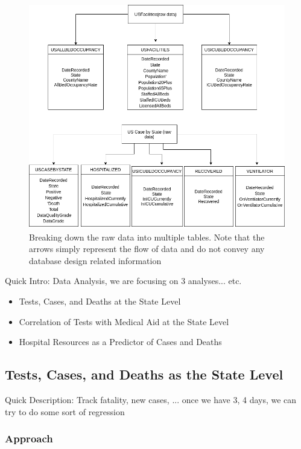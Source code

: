 \documentclass[11pt]{article}
\begin{document}
\FloatBarrier
\begin{figure}[h]
    \centering
    \includegraphics[width=\textwidth]{diagrams/data_breakdown.png}
    \caption{Breaking down the raw data into multiple tables. Note that the arrows simply represent the flow of data and do not convey any database design related information}
    \label{fig:tbl_bd}
\end{figure}
\FloatBarrier

\noindent
Quick Intro: Data Analysis, we are focusing on 3 analyses... etc. 

\begin{itemize}
    \item Tests, Cases, and Deaths at the State Level
    \item Correlation of Tests with Medical Aid at the State Level
    \item Hospital Resources as a Predictor of Cases and Deaths
\end{itemize}

\subsection{Tests, Cases, and Deaths as the State Level}

\noindent
Quick Description: Track fatality, new cases, ... once we have 3, 4 days, we can try to do some sort of regression

\subsubsection{Approach}
\end{document}
